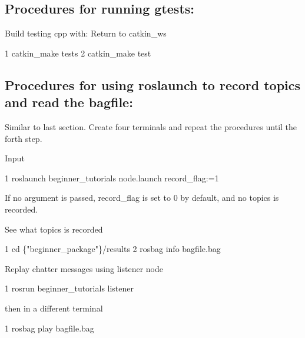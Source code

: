 \subsection*{Procedures for running gtests\+:}


\begin{DoxyEnumerate}
\item Build testing cpp with\+: Return to catkin\+\_\+ws 
\begin{DoxyCode}
1 catkin\_make tests
2 catkin\_make test
\end{DoxyCode}

\end{DoxyEnumerate}

\subsection*{Procedures for using roslaunch to record topics and read the bagfile\+:}


\begin{DoxyEnumerate}
\item Similar to last section. Create four terminals and repeat the procedures until the forth step.
\item Input 
\begin{DoxyCode}
1 roslaunch beginner\_tutorials node.launch record\_flag:=1
\end{DoxyCode}
 If no argument is passed, record\+\_\+flag is set to 0 by default, and no topics is recorded.
\item See what topics is recorded 
\begin{DoxyCode}
1 cd \{"beginner\_package"\}/results
2 rosbag info bagfile.bag
\end{DoxyCode}

\item Replay chatter messages using listener node 
\begin{DoxyCode}
1 rosrun beginner\_tutorials listener
\end{DoxyCode}
 then in a different terminal 
\begin{DoxyCode}
1 rosbag play bagfile.bag
\end{DoxyCode}
 
\end{DoxyEnumerate}